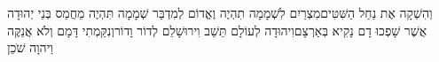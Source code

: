 \documentclass[../main/main.tex]{subfiles}
\begin{document}
\begin{multicols}{\ncols}
וְהִשְׁקָה אֶת נַחַל הַשִּׁטִּים\PreVerseSpace{}מִצְרַיִם לִשְׁמָמָה תִהְיֶה וֶאֱדוֹם לְמִדְבַּר שְׁמָמָה תִּהְיֶה מֵחֲמַס בְּנֵי יְהוּדָה אֲשֶׁר שָׁפְכוּ דָם נָקִיא בְּאַרְצָם\PreVerseSpace{}וִיהוּדָה לְעוֹלָם תֵּשֵׁב וִירוּשָׁלֵם לְדוֹר וָדוֹר\PreVerseSpace{}וְנִקַּמְתִי\SubEnd{} דָּמָם וְלֹא אֲנַקֶּה\SubEnd{} וַיהוָה שֹׁכֵן\par
\pagebreak
\end{multicols}
\end{document}
